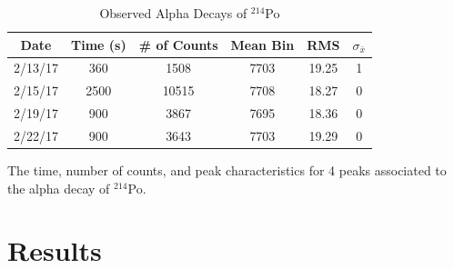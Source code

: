 \documentclass[10pt]{IEEEtran}
\begin{document}
     \begin{table}[!h]
        \begin{center}
        \caption{Observed Alpha Decays of $^{214}$Po}
        \label{tab:po214}
        \begin{tabular}{|c|c|c|c|c|c|}
            \hline
            Date & Time (s) & \# of Counts & Mean Bin & RMS & $\sigma_{\bar{x}}$ \\
            \hline
            2/13/17 & 360 & 1508 & 7703 & 19.25 & 1 \\
            \hline
            2/15/17 & 2500 & 10515 & 7708 & 18.27 & 0 \\
            \hline
            2/19/17 & 900 & 3867 & 7695 & 18.36 & 0 \\
            \hline
            2/22/17 & 900 & 3643 & 7703 & 19.29 & 0 \\
            \hline
        \end{tabular}
        \end{center}
        The time, number of counts, and peak characteristics for 4 peaks associated to the alpha decay of $^{214}$Po.
    \end{table}
    
\newpage    
    
\section{Results}
\end{document}

